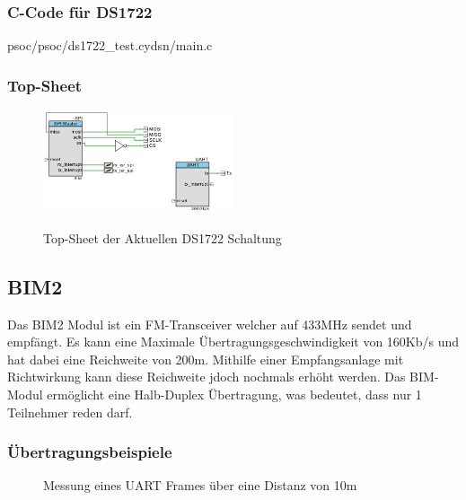 \documentclass[12pt,a4paper,german]{article}
\begin{document}
\subsubsection{C-Code für DS1722}


	{psoc/psoc/ds1722_test.cydsn/main.c}

\subsubsection{Top-Sheet}
	 
 \begin{figure}[H]
	\centering
	\includegraphics[width=0.5\textwidth]{pictures/topsch_ds1722.png}
	\label{fig:topsch_ds1722}
	\caption{Top-Sheet der Aktuellen DS1722 Schaltung}
\end{figure}

\subsection{BIM2}

Das BIM2 Modul ist ein FM-Transceiver welcher auf 433MHz sendet und empfängt.
Es kann eine Maximale Übertragungsgeschwindigkeit von 160Kb/s und
hat dabei eine Reichweite von 200m. Mithilfe einer Empfangsanlage mit
Richtwirkung kann diese Reichweite jdoch nochmals erhöht werden. Das BIM-Modul
ermöglicht eine Halb-Duplex Übertragung, was bedeutet, dass nur 1 Teilnehmer
reden darf. 

\subsubsection{Übertragungsbeispiele}

\begin{figure}[H]
	
	\centering
	\label{fig:lorentzframe}

	\caption{Messung eines UART Frames über eine Distanz von 10m}
\end{figure}
\end{document}
